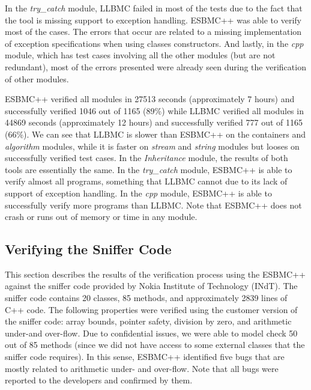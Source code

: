 \documentclass[conference]{IEEEtran}
\begin{document}
In the \textit{try\_catch} module, LLBMC failed in most of the tests due to the fact that
the tool is missing support to exception handling. ESBMC++ was able to verify most of the cases.
The errors that occur are related to a missing implementation of exception specifications when
using classes constructors. And lastly, in the \textit{cpp} module, which has test cases involving all
the other modules (but are not redundant), most of the errors presented were already seen during
the verification of other modules.

ESBMC++ verified all modules in 27513 seconds (approximately 7 hours)
and successfully verified 1046 out of 1165 (89\%) while LLBMC verified all modules
in 44869 seconds (approximately 12 hours) and successfully verified 777 out of 1165
(66\%). We can see that LLBMC is slower than ESBMC++ on the containers
and \textit{algorithm} modules, while it is faster on \textit{stream} and
\textit{string} modules but looses on successfully verified test cases.
In the \textit{Inheritance} module, the results of both tools are essentially the same.
In the \textit{try\_catch} module, ESBMC++ is able to verify almost all programs,
something that LLBMC cannot due to its lack of support of exception handling.
In the \textit{cpp} module, ESBMC++ is able to successfully verify more programs than LLBMC.
Note that ESBMC++ does not crash or runs out of memory or time in any module.

\subsection{Verifying the Sniffer Code}
\label{verifying-the-sniffer-code}

This section describes the results of the verification process using the
ESBMC++ against the sniffer code provided by Nokia Institute of Technology
(INdT). The sniffer code contains 20 classes, 85 methods, and approximately
2839 lines of C++ code. The following properties were verified using the customer version
of the sniffer code: array bounds, pointer safety, division by zero,
and arithmetic under-and over-flow. Due to confidential issues, we were able to model check
50 out of 85 methods (since we did not have access to some external classes that the sniffer
code requires). In this sense, ESBMC++ identified five bugs that are mostly related to arithmetic under-
and over-flow. Note that all bugs were reported to the developers and confirmed by them.
\end{document}
